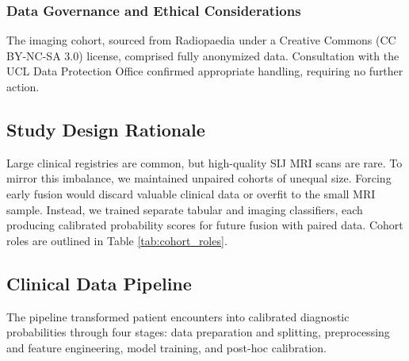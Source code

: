 \documentclass[12pt, a4paper]{article}
\begin{document}
\subsubsection{Data Governance and Ethical Considerations}
The imaging cohort, sourced from Radiopaedia under a Creative Commons (CC BY-NC-SA 3.0) license, comprised fully anonymized data. Consultation with the UCL Data Protection Office confirmed appropriate handling, requiring no further action.

\subsection{Study Design Rationale}
Large clinical registries are common, but high-quality SIJ MRI scans are rare. To mirror this imbalance, we maintained unpaired cohorts of unequal size. Forcing early fusion would discard valuable clinical data or overfit to the small MRI sample. Instead, we trained separate tabular and imaging classifiers, each producing calibrated probability scores for future fusion with paired data. Cohort roles are outlined in Table \ref{tab:cohort_roles}.

\begin{table}[H]
\centering
\small
\caption{Independent Cohorts and Their Roles in the Study}
\label{tab:cohort_roles}
\end{table}





\subsection{Clinical Data Pipeline}
The pipeline transformed patient encounters into calibrated diagnostic probabilities through four stages: data preparation and splitting, preprocessing and feature engineering, model training, and post-hoc calibration.
\end{document}
